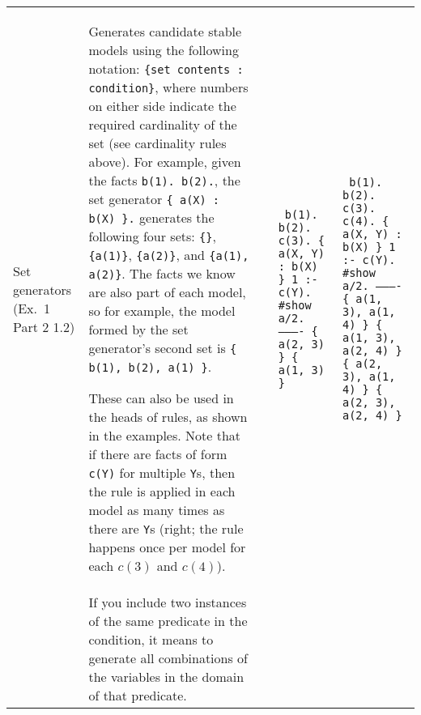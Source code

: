 \documentclass[9pt,a4paper,landscape]{article}
\begin{document}
{\begin{longtable}{Lp{14.5cm}lXX}
Set generators \newline (Ex.\ 1 Part 2 1.2)
& Generates candidate stable models using the following notation: \texttt{\{set contents : condition\}}, where numbers on either side indicate the required cardinality of the set (see cardinality rules above).
For example, given the facts \texttt{b(1). b(2).}, the set generator \texttt{\{ a(X) : b(X) \}.} generates the following four sets: \texttt{\{\}}, \texttt{\{a(1)\}}, \texttt{\{a(2)\}}, and \texttt{\{a(1), a(2)\}}.
The facts we know are also part of each model, so for example, the model formed by the set generator's second set is \texttt{\{ b(1), b(2), a(1) \}}. \newline

These can also be used in the heads of rules, as shown in the examples. 
Note that if there are facts of form \texttt{c(Y)} for multiple \texttt{Y}s, then the rule is applied in each model as many times as there are \texttt{Y}s (right; the rule happens once per model for each $c(3)$ and $c(4)$).

&& {\fontsize{6.5}{4}\texttt{%
		b(1). b(2). c(3).  \{ a(X, Y) : b(X) \} 1 :- c(Y).\newline
		\#show a/2.\newline
		---------- \newline
		\{ a(2, 3) \} \newline
		\{ a(1, 3) \} \newline
}} &
{\fontsize{6.5}{4}\texttt{%
		b(1). b(2). c(3). c(4).  \{ a(X, Y) : b(X) \} 1 :- c(Y).\newline
		\#show a/2.\newline
		---------- \newline
		\{ a(1, 3), a(1, 4) \} \newline
		\{ a(1, 3), a(2, 4) \} \newline
		\{ a(2, 3), a(1, 4) \} \newline
		\{ a(2, 3), a(2, 4) \} \newline
}}
\\ 


& If you include two instances of the same predicate in the condition, it means to generate all combinations of the variables in the domain of that predicate.


\end{longtable}}
\end{document}
